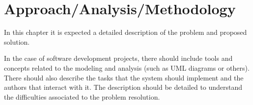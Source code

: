 \chapter{Approach/Analysis/Methodology}\label{cap:metodology}

In this chapter it is expected a detailed description of the problem and proposed solution.

In the case of software development projects, there should include tools and concepts related to the modeling and analysis (such as UML diagrams or others). There should also describe the tasks that the system should implement and the authors that interact with it. The description should be detailed to understand the difficulties associated to the problem resolution.
